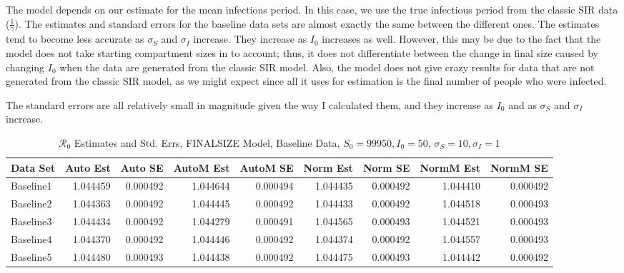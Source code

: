 \documentclass[12pt]{article}
\newcommand{\rr}{\ensuremath{\mathcal{R}_0}}
\begin{document}
The model depends on our estimate for the mean infectious period. In this case, we use the true infectious period from the classic SIR data ($\frac{1}{\gamma}$). The estimates and standard errors for the baseline data sets are almost exactly the same between the different ones. The estimates tend to become less accurate as $\sigma_S$ and $\sigma_I$ increase. They increase as $I_0$ increases as well. However, this may be due to the fact that the model does not take starting compartment sizes in to account; thus, it does not differentiate between the change in final size caused by changing $I_0$ when the data are generated from the classic SIR model. Also, the model does not give crazy results for data that are not generated from the classic SIR model, as we might expect since all it uses for estimation is the final number of people who were infected.

The standard errors are all relatively small in magnitude given the way I calculated them, and they increase as $I_0$ and as $\sigma_S$ and $\sigma_I$ increase.

\begin{table}[H]
	
	\caption{$\rr$ Estimates and Std. Errs, FINALSIZE Model, 
		Baseline Data, $S_0 = 99950, I_0 = 50$, 
		$\sigma_S = 10, \sigma_I = 1$}
	\begin{footnotesize}
		\hskip -1cm
	\begin{tabular}{l|r|r|r|r|r|r|r|r}
		\hline
		Data Set & Auto Est & Auto SE & AutoM Est & AutoM SE & Norm Est & Norm SE & NormM Est & NormM SE\\
		\hline
		Baseline1 & 1.044459 & 0.000492 & 1.044644 & 0.000494 & 1.044435 & 0.000492 & 1.044410 & 0.000492\\
		\hline
		Baseline2 & 1.044363 & 0.000492 & 1.044445 & 0.000492 & 1.044433 & 0.000492 & 1.044518 & 0.000493\\
		\hline
		Baseline3 & 1.044434 & 0.000492 & 1.044279 & 0.000491 & 1.044565 & 0.000493 & 1.044521 & 0.000493\\
		\hline
		Baseline4 & 1.044370 & 0.000492 & 1.044446 & 0.000492 & 1.044374 & 0.000492 & 1.044557 & 0.000493\\
		\hline
		Baseline5 & 1.044480 & 0.000493 & 1.044438 & 0.000492 & 1.044475 & 0.000493 & 1.044442 & 0.000492\\
		\hline
	\end{tabular}
\end{footnotesize}
\end{table}
\end{document}

